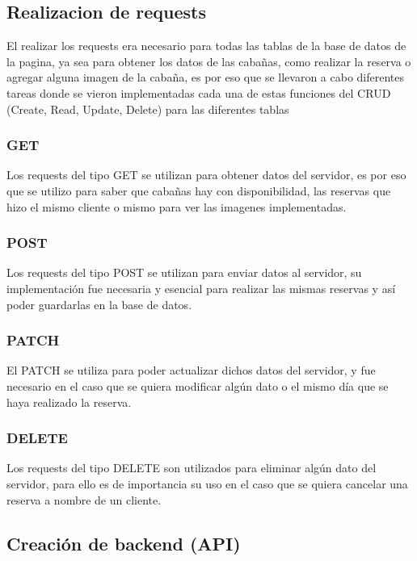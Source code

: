 \subsection{Realizacion de requests}

El realizar los requests era necesario para todas las tablas de la base de datos de la pagina, ya sea para obtener los datos de las cabañas, como realizar la reserva o agregar alguna imagen de la cabaña, es por eso que se llevaron a cabo diferentes tareas donde se vieron implementadas cada una de estas funciones del CRUD (Create, Read, Update, Delete) para las diferentes tablas

\subsubsection{GET}

Los requests del tipo GET se utilizan para obtener datos del servidor, es por eso que se utilizo para saber que cabañas hay con disponibilidad, las reservas que hizo el mismo cliente o mismo para ver las imagenes implementadas.

\subsubsection{POST}

Los requests del tipo POST se utilizan para enviar datos al servidor, su implementación fue necesaria y esencial para realizar las mismas reservas y así poder guardarlas en la base de datos.

\subsubsection{PATCH}

El PATCH se utiliza para poder actualizar dichos datos del servidor, y fue necesario en el caso que se quiera modificar algún dato o el mismo día que se haya realizado la reserva.

\subsubsection{DELETE}

Los requests del tipo DELETE son utilizados para eliminar algún dato del servidor, para ello es de importancia su uso en el caso que se quiera cancelar una reserva a nombre de un cliente.

\subsection{Creación de backend (API)}

